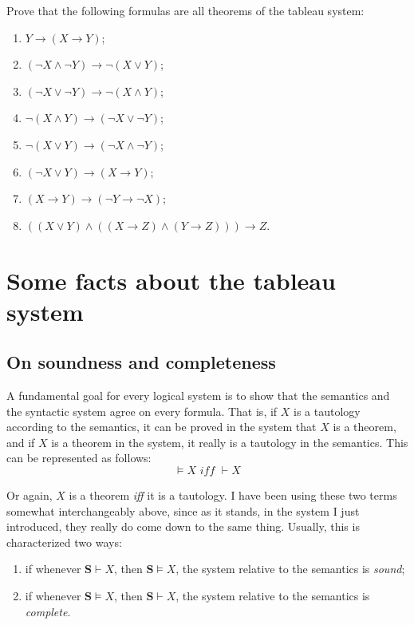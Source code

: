 \begin{exc}
	Prove that the following formulas are all theorems of the tableau system: 
	
	\begin{enumerate}
		\item $Y \rightarrow (X \rightarrow Y)$;
		\item $(\neg X \wedge \neg Y) \rightarrow \neg(X \vee Y)$;
		\item $(\neg X \vee \neg Y) \rightarrow \neg(X \wedge Y)$;
		\item $\neg (X \wedge Y) \rightarrow (\neg X \vee \neg Y)$;
		\item $\neg (X \vee Y) \rightarrow (\neg X \wedge \neg Y)$;
		\item $(\neg X \vee Y) \rightarrow (X \rightarrow Y)$;
		\item $(X \rightarrow Y) \rightarrow (\neg Y \rightarrow \neg X)$;
		\item $((X \vee Y) \wedge ((X \rightarrow Z) \wedge (Y \rightarrow Z))) \rightarrow Z$.
	\end{enumerate}
\end{exc}


\section{Some facts about the tableau system}

\subsection{On soundness and completeness}

A fundamental goal for every logical system is to show that the semantics and the syntactic system agree on every formula. That is, if $X$ is a tautology according to the semantics, it can be proved in the system that $X$ is a theorem, and if $X$ is a theorem in the system, it really is a tautology in the semantics. This can be represented as follows: 
\[\models X \textit{ iff } \vdash X\]

Or again, $X$ is a theorem \textit{iff} it is a tautology. I have been using these two terms somewhat interchangeably above, since as it stands, in the system I just introduced, they really do come down to the same thing. Usually, this is characterized two ways:

\begin{enumerate}
	\item if whenever $\mathbf{S} \vdash X$, then $\mathbf{S} \models X$, the system relative to the semantics is \textit{sound};
	\item if whenever $\mathbf{S} \models X$, then $\mathbf{S} \vdash X$, the system relative to the semantics is \textit{complete}. 
\end{enumerate}

